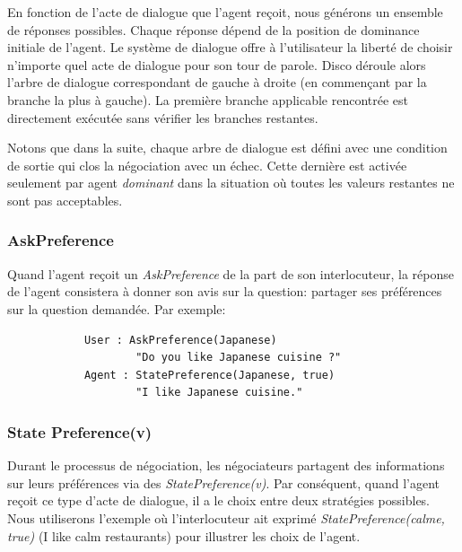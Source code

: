 	En fonction de l'acte de dialogue que l'agent reçoit, nous générons un ensemble de réponses possibles. Chaque réponse dépend de la position de dominance initiale de l'agent. Le système de dialogue offre à l'utilisateur la liberté de choisir n'importe quel acte de dialogue pour son tour de parole. Disco déroule alors l'arbre de dialogue correspondant de gauche à droite (en commençant par la branche la plus à gauche). La première branche applicable rencontrée est directement exécutée sans vérifier les branches restantes.
	
	Notons que dans la suite, chaque arbre de dialogue est défini avec une condition de sortie qui clos la négociation avec un échec. Cette dernière est activée seulement par agent \emph{dominant} dans la situation où toutes les valeurs restantes ne sont pas acceptables. 
	
	\subsubsection{AskPreference}
		Quand l'agent reçoit un \emph{AskPreference} de la part de son interlocuteur, la réponse de l'agent consistera à donner son avis sur la question: partager ses préférences sur la question demandée. Par exemple: 
		
		\begin{verbatim}
			User : AskPreference(Japanese) 
					"Do you like Japanese cuisine ?"
			Agent : StatePreference(Japanese, true)
					"I like Japanese cuisine."
		\end{verbatim}
	

		 
		 
	\subsubsection{State Preference(v)}
		Durant le processus de négociation, les négociateurs partagent des informations sur leurs préférences via des \emph{StatePreference(v)}. Par conséquent, quand l'agent reçoit ce type d'acte de dialogue, il a le choix entre deux stratégies possibles. Nous utiliserons l'exemple où l'interlocuteur ait exprimé  \emph{StatePreference(calme, true)} (I like calm restaurants) pour illustrer les choix de l'agent. 
		
		
